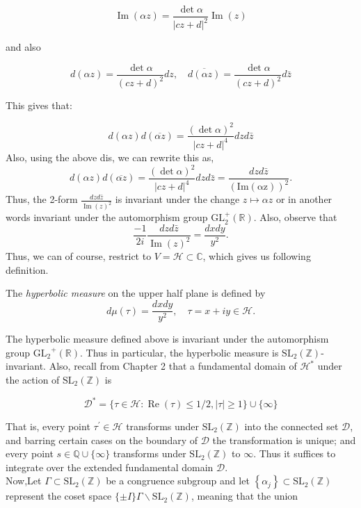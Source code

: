 $$
\operatorname{Im}(\alpha z)=\frac{\operatorname{det} \alpha}{|c z+d|^{2}} \operatorname{Im}(z)
$$

and also

$$
d(\alpha z)=\frac{\operatorname{det} \alpha}{(c z+d)^{2}} d z, \quad \overline{d(\alpha z)}=\frac{\operatorname{det} \alpha}{(c z+d)^{2}} d \bar{z}
$$

This gives that:

$$
d(\alpha z)  d (\overline{\alpha z})=\frac{(\operatorname{det} \alpha)^{2}}{|c z+d|^{4}} d z  d \bar{z}
$$
Also, using the above dis, we can rewrite this as,
$$d(\alpha z)  d (\overline{\alpha z})=\frac{(\operatorname{det} \alpha)^{2}}{|c z+d|^{4}} d z  d \bar{z}=\frac{d z  d \bar{z}}{\operatorname{(Im(\alpha z))^2}}.$$
Thus, the 2-form $\frac{d z d \bar{z}}{\operatorname{Im}(z)^{2}}$ is invariant under the change $z \mapsto \alpha z$ or in another words invariant under the automorphism group $\mathrm{GL}_{2}^{+}(\mathbb{R}).$ Also, observe that $$\frac{-1}{2 i} \frac{d z d \bar{z}}{\operatorname{Im}(z)^{2}}=\frac{d x d y}{y^{2}}.$$ Thus, we can of course, restrict to $V=\mathcal{H}\subset \mathbb{C}$, which gives us following definition.
\begin{definition}
    The \textit{hyperbolic measure} on the upper half plane is defined by $$d \mu(\tau)=\frac{d x d y}{y^{2}}, \quad \tau=x+i y \in \mathcal{H}.$$
\end{definition}

The hyperbolic measure defined above is invariant under the automorphism group $\operatorname{GL_2}^{+}(\mathbb{R})$. Thus in particular, the hyperbolic measure is $\mathrm{SL}_2(\mathbb{Z})$-invariant. Also,  recall from Chapter 2 that a fundamental domain of $\mathcal{H}^{*}$ under the action of $\mathrm{SL}_{2}(\mathbb{Z})$ is

$$
\mathcal{D}^{*}=\{\tau \in \mathcal{H}: \operatorname{Re}(\tau) \leq 1 / 2,|\tau| \geq 1\} \cup\{\infty\}
$$

That is, every point $\tau^{\prime} \in \mathcal{H}$ transforms under $\mathrm{SL}_{2}(\mathbb{Z})$ into the connected set $\mathcal{D}$, and barring certain cases on the boundary of $\mathcal{D}$ the transformation is unique; and every point $s \in \mathbb{Q} \cup\{\infty\}$ transforms under $\mathrm{SL}_{2}(\mathbb{Z})$ to $\infty$. Thus it suffices to integrate over the extended fundamental domain $\mathcal{D}$.\\


Now,Let $\Gamma \subset \mathrm{SL}_{2}(\mathbb{Z})$ be a congruence subgroup and let $\left\{\alpha_{j}\right\} \subset \mathrm{SL}_{2}(\mathbb{Z})$ represent the coset space $\{ \pm I\} \Gamma \backslash \mathrm{SL}_{2}(\mathbb{Z})$, meaning that the union

